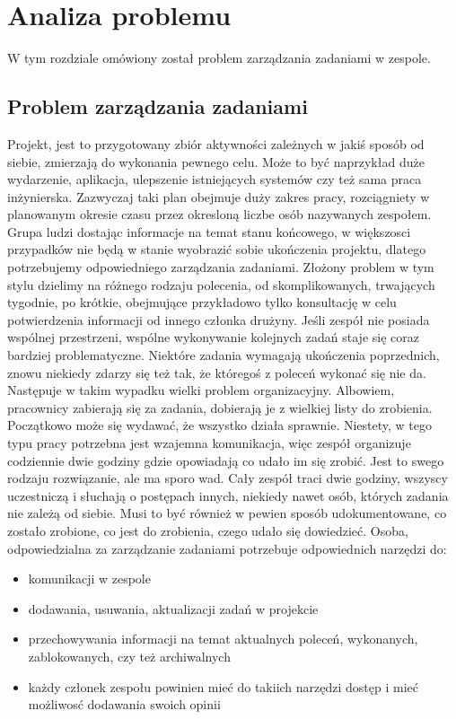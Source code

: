 \chapter{Analiza problemu}
\thispagestyle{chapterBeginStyle}

W tym rozdziale omówiony został problem zarządzania zadaniami w zespole.
\section{Problem zarządzania zadaniami}

Projekt, jest to przygotowany zbiór aktywności zależnych w jakiś sposób od siebie, zmierzają do wykonania pewnego celu. Może to być naprzykład duże wydarzenie, aplikacja, ulepszenie istniejących systemów czy też sama praca inżynierska. Zazwyczaj taki plan obejmuje duży zakres pracy, rozciągniety w planowanym okresie czasu przez okresloną liczbe osób nazywanych zespołem. Grupa ludzi dostając informacje na temat stanu końcowego, w większosci przypadków nie będą w stanie wyobrazić sobie ukończenia projektu, dlatego potrzebujemy odpowiedniego zarządzania zadaniami. Złożony problem w tym stylu dzielimy na różnego rodzaju polecenia, od skomplikowanych, trwających tygodnie, po krótkie, obejmujące przykładowo tylko konsultację w celu potwierdzenia informacji od innego członka drużyny. Jeśli zespół nie posiada wspólnej przestrzeni, wspólne wykonywanie kolejnych zadań staje się coraz bardziej problematyczne. Niektóre zadania wymagają ukończenia poprzednich, znowu niekiedy zdarzy się też tak, że któregoś z poleceń wykonać się nie da. Następuje w takim wypadku wielki problem organizacyjny. Albowiem, pracownicy zabierają się za zadania, dobierają je z wielkiej listy do zrobienia. Początkowo może się wydawać, że wszystko działa sprawnie. Niestety, w tego typu pracy potrzebna jest wzajemna komunikacja, więc zespół organizuje codziennie dwie godziny gdzie opowiadają co udało im się zrobić. Jest to swego rodzaju rozwiązanie, ale ma sporo wad. Cały zespół traci dwie godziny, wszyscy uczestniczą i słuchają o postępach innych, niekiedy nawet osób, których zadania nie zależą od siebie. Musi to być również w pewien sposób udokumentowane, co zostało zrobione, co jest do zrobienia, czego udało się dowiedzieć. Osoba, odpowiedzialna za zarządzanie zadaniami potrzebuje odpowiednich narzędzi do:
\begin{itemize}
	\item  komunikacji w zespole
	\item  dodawania, usuwania, aktualizacji zadań w projekcie
	\item  przechowywania informacji na temat aktualnych poleceń, wykonanych, zablokowanych, czy też archiwalnych
	\item każdy członek zespołu powinien mieć do takiich narzędzi dostęp i mieć możliwosć dodawania swoich opinii
\end{itemize}
